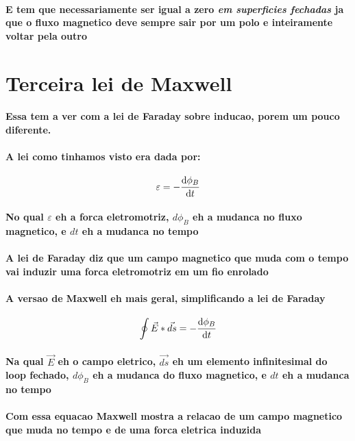 \documentclass[12pt,twoside, a4paper, twocolumn]{article}
\begin{document}
\paragraph*{E tem que necessariamente ser igual a zero \emph{em superficies fechadas} ja que o fluxo magnetico deve sempre sair por um polo e inteiramente voltar pela outro}

\section{Terceira lei de Maxwell}
\paragraph*{Essa tem a ver com a lei de Faraday sobre inducao, porem um pouco diferente.}
\paragraph*{A lei como tinhamos visto era dada por:}
\begin{equation}
    \varepsilon = - \frac{\mathrm d \phi_B}{\mathrm d t}
\end{equation}
\paragraph*{No qual $\varepsilon$ eh a forca eletromotriz, $d\phi_B$ eh a mudanca no fluxo magnetico, e $dt$ eh a mudanca no tempo}
\paragraph*{A lei de Faraday diz que um campo magnetico que muda com o tempo vai induzir uma forca eletromotriz em um fio enrolado}
\paragraph*{A versao de Maxwell eh mais geral, simplificando a lei de Faraday}
\begin{equation}
    \oint \vec{E} * \vec{ds} = - \frac{\mathrm d \phi_B}{\mathrm d t}
\end{equation}
\paragraph*{Na qual $\vec{E}$ eh o campo eletrico, $\vec{ds}$ eh um elemento infinitesimal do loop fechado, $d\phi_B$ eh a mudanca do fluxo magnetico, e $dt$ eh a mudanca no tempo}
\paragraph*{Com essa equacao Maxwell mostra a relacao de um campo magnetico que muda no tempo e de uma forca eletrica induzida}
\end{document}
